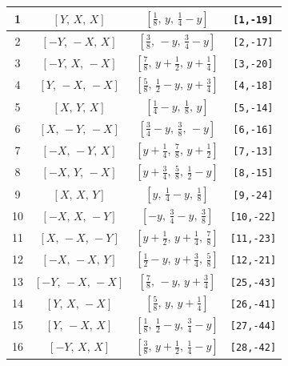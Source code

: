 \documentclass[fleqn,8pt]{jsarticle}
\begin{document}
\begin{longtable}{cccc}
1 & $\left[ Y,\, X,\, X \right]$ & $\left[ \frac{1}{8},\, y,\, \frac{1}{4} - y \right]$ & {\tt [1,-19]} \\ \hline
2 & $\left[ - Y,\, - X,\, X \right]$ & $\left[ \frac{3}{8},\, - y,\, \frac{3}{4} - y \right]$ & {\tt [2,-17]} \\ \hline
3 & $\left[ - Y,\, X,\, - X \right]$ & $\left[ \frac{7}{8},\, y + \frac{1}{2},\, y + \frac{1}{4} \right]$ & {\tt [3,-20]} \\ \hline
4 & $\left[ Y,\, - X,\, - X \right]$ & $\left[ \frac{5}{8},\, \frac{1}{2} - y,\, y + \frac{3}{4} \right]$ & {\tt [4,-18]} \\ \hline
5 & $\left[ X,\, Y,\, X \right]$ & $\left[ \frac{1}{4} - y,\, \frac{1}{8},\, y \right]$ & {\tt [5,-14]} \\ \hline
6 & $\left[ X,\, - Y,\, - X \right]$ & $\left[ \frac{3}{4} - y,\, \frac{3}{8},\, - y \right]$ & {\tt [6,-16]} \\ \hline
7 & $\left[ - X,\, - Y,\, X \right]$ & $\left[ y + \frac{1}{4},\, \frac{7}{8},\, y + \frac{1}{2} \right]$ & {\tt [7,-13]} \\ \hline
8 & $\left[ - X,\, Y,\, - X \right]$ & $\left[ y + \frac{3}{4},\, \frac{5}{8},\, \frac{1}{2} - y \right]$ & {\tt [8,-15]} \\ \hline
9 & $\left[ X,\, X,\, Y \right]$ & $\left[ y,\, \frac{1}{4} - y,\, \frac{1}{8} \right]$ & {\tt [9,-24]} \\ \hline
10 & $\left[ - X,\, X,\, - Y \right]$ & $\left[ - y,\, \frac{3}{4} - y,\, \frac{3}{8} \right]$ & {\tt [10,-22]} \\ \hline
11 & $\left[ X,\, - X,\, - Y \right]$ & $\left[ y + \frac{1}{2},\, y + \frac{1}{4},\, \frac{7}{8} \right]$ & {\tt [11,-23]} \\ \hline
12 & $\left[ - X,\, - X,\, Y \right]$ & $\left[ \frac{1}{2} - y,\, y + \frac{3}{4},\, \frac{5}{8} \right]$ & {\tt [12,-21]} \\ \hline
13 & $\left[ - Y,\, - X,\, - X \right]$ & $\left[ \frac{7}{8},\, - y,\, y + \frac{3}{4} \right]$ & {\tt [25,-43]} \\ \hline
14 & $\left[ Y,\, X,\, - X \right]$ & $\left[ \frac{5}{8},\, y,\, y + \frac{1}{4} \right]$ & {\tt [26,-41]} \\ \hline
15 & $\left[ Y,\, - X,\, X \right]$ & $\left[ \frac{1}{8},\, \frac{1}{2} - y,\, \frac{3}{4} - y \right]$ & {\tt [27,-44]} \\ \hline
16 & $\left[ - Y,\, X,\, X \right]$ & $\left[ \frac{3}{8},\, y + \frac{1}{2},\, \frac{1}{4} - y \right]$ & {\tt [28,-42]} \\ \hline

\end{longtable}
\end{document}
